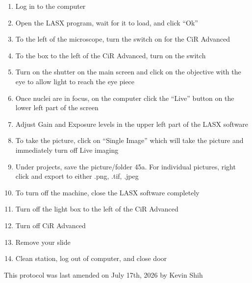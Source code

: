 \documentclass[
]{article}
\providecommand{\tightlist}{%
  \setlength{\itemsep}{0pt}\setlength{\parskip}{0pt}}
\begin{document}
\begin{enumerate}
\def\labelenumi{\arabic{enumi}.}
\setcounter{enumi}{36}
\tightlist
\item
  Log in to the computer
\item
  Open the LASX program, wait for it to load, and click ``Ok''
\item
  To the left of the microscope, turn the switch on for the CiR Advanced
\item
  To the box to the left of the CiR Advanced, turn on the switch
\item
  Turn on the shutter on the main screen and click on the objective with
  the eye to allow light to reach the eye piece
\item
  Once nuclei are in focus, on the computer click the ``Live'' button on
  the lower left part of the screen
\item
  Adjust Gain and Exposure levels in the upper left part of the LASX
  software
\item
  To take the picture, click on ``Single Image'' which will take the
  picture and immediately turn off Live imaging
\item
  Under projects, save the picture/folder 45a. For individual pictures,
  right click and export to either .png, .tif, .jpeg
\item
  To turn off the machine, close the LASX software completely
\item
  Turn off the light box to the left of the CiR Advanced
\item
  Turn off CiR Advanced
\item
  Remove your slide
\item
  Clean station, log out of computer, and close door
\end{enumerate}

This protocol was last amended on July 17th, 2026 by Kevin Shih
\end{document}
